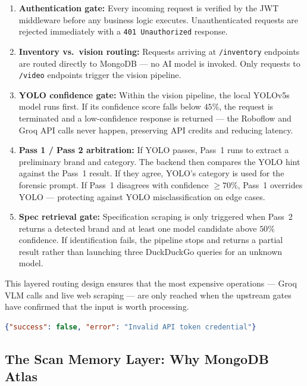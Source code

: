 \begin{enumerate}
  \item \textbf{Authentication gate:} Every incoming request is verified by the JWT middleware before any business logic executes. Unauthenticated requests are rejected immediately with a \texttt{401 Unauthorized} response.
  \item \textbf{Inventory vs.\ vision routing:} Requests arriving at \texttt{/inventory} endpoints are routed directly to MongoDB — no AI model is invoked. Only requests to \texttt{/video} endpoints trigger the vision pipeline.
  \item \textbf{YOLO confidence gate:} Within the vision pipeline, the local YOLOv5s model runs first. If its confidence score falls below $45\%$, the request is terminated and a low-confidence response is returned — the Roboflow and Groq API calls never happen, preserving API credits and reducing latency.
  \item \textbf{Pass 1 / Pass 2 arbitration:} If YOLO passes, Pass~1 runs to extract a preliminary brand and category. The backend then compares the YOLO hint against the Pass~1 result. If they agree, YOLO's category is used for the forensic prompt. If Pass~1 disagrees with confidence $\geq 70\%$, Pass~1 overrides YOLO — protecting against YOLO misclassification on edge cases.
  \item \textbf{Spec retrieval gate:} Specification scraping is only triggered when Pass~2 returns a detected brand and at least one model candidate above $50\%$ confidence. If identification fails, the pipeline stops and returns a partial result rather than launching three DuckDuckGo queries for an unknown model.
\end{enumerate}

This layered routing design ensures that the most expensive operations — Groq VLM calls and live web scraping — are only reached when the upstream gates have confirmed that the input is worth processing.

\begin{lstlisting}[language=json, caption={Standard error response format for rejected or failed requests}]
{"success": false, "error": "Invalid API token credential"}
\end{lstlisting}

\subsection{The Scan Memory Layer: Why MongoDB Atlas}

